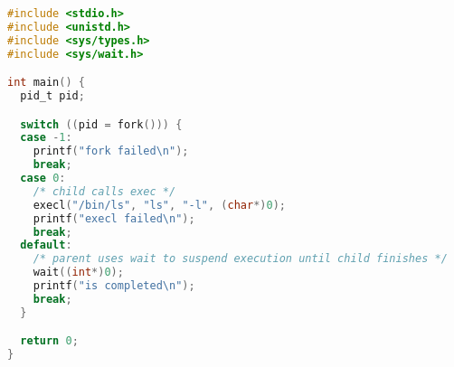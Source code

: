 \begin{lstlisting}[language={C}, caption={C code}]
#include <stdio.h>
#include <unistd.h>
#include <sys/types.h>
#include <sys/wait.h>

int main() {
  pid_t pid;

  switch ((pid = fork())) {
  case -1:
    printf("fork failed\n");
    break;
  case 0:
    /* child calls exec */
    execl("/bin/ls", "ls", "-l", (char*)0);
    printf("execl failed\n");
    break;
  default:
    /* parent uses wait to suspend execution until child finishes */
    wait((int*)0);
    printf("is completed\n");
    break;
  }

  return 0;
}
\end{lstlisting}
